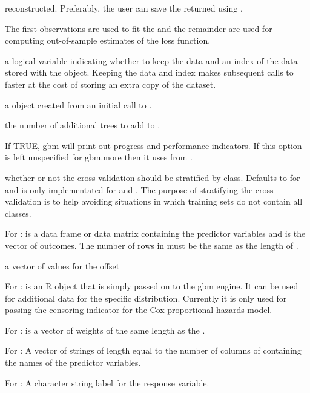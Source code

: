 \begin{Arguments}
\begin{ldescription}
reconstructed. Preferably, the user can save the returned
 using .
\item[\code{train.fraction}] The first 
observations are used to fit the  and the remainder are used for
computing out-of-sample estimates of the loss function.
\item[\code{keep.data}] a logical variable indicating whether to keep the data and
an index of the data stored with the object. Keeping the data and index makes
subsequent calls to  faster at the cost of storing an
extra copy of the dataset.
\item[\code{object}] a  object created from an initial call to
.
\item[\code{n.new.trees}] the number of additional trees to add to .
\item[\code{verbose}] If TRUE, gbm will print out progress and performance indicators.
If this option is left unspecified for gbm.more then it uses  from
.
\item[\code{class.stratify.cv}] whether or not the cross-validation should be stratified by
class. Defaults to  for  and is only 
implementated for  and . The purpose of stratifying
the cross-validation is to help avoiding situations in which training sets do
not contain all classes.
\item[\code{x, y}] For :  is a data frame or data matrix containing the
predictor variables and  is the vector of outcomes. The number of rows
in  must be the same as the length of .
\item[\code{offset}] a vector of values for the offset
\item[\code{misc}] For :  is an R object that is simply passed on to
the gbm engine. It can be used for additional data for the specific distribution.
Currently it is only used for passing the censoring indicator for the Cox
proportional hazards model.
\item[\code{w}] For :  is a vector of weights of the same
length as the .
\item[\code{var.names}] For : A vector of strings of length equal to the
number of columns of  containing the names of the predictor variables.
\item[\code{response.name}] For : A character string label for the response
variable.
\end{ldescription}
\end{Arguments}
